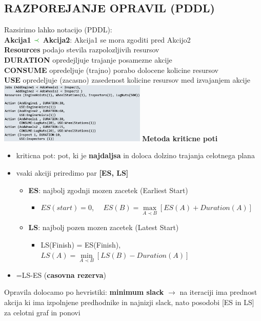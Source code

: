 \subsection{RAZPOREJANJE OPRAVIL (PDDL)}
Razsirimo lahko notacijo (PDDL):\\
\textbf{Akcija1 $\green{\prec}$ Akcija2}: Akcija1 se mora zgoditi pred Akcijo2\\
\textbf{Resources} podajo stevila razpolozljivih resursov\\
\textbf{DURATION} opredejljuje trajanje posamezne akcije\\
\textbf{CONSUME} opredeljuje (trajno) porabo dolocene kolicine resursov\\
\textbf{USE} opredeljuje (zacasno) zasedenost kolicine resursov med izvajanjem akcije\\
\includegraphics[width=7cm]{./images/pddl.png}
\textbf{Metoda kriticne poti}
\begin{itemize}[leftmargin=*,noitemsep,topsep=0pt]
    \item kriticna pot: pot, ki je \textbf{najdaljsa} in doloca dolzino trajanja celotnega plana
    \item vsaki akciji priredimo par \textbf{[ES, LS]}
    \begin{itemize}[leftmargin=*,noitemsep,topsep=0pt]
        \item \textbf{ES}: najbolj zgodnji mozen zacetek (Earliest Start)
        \begin{itemize}[leftmargin=*,noitemsep,topsep=0pt]
            \item $ES(start) = 0$, $\quad ES(B) = \max\limits_{A \prec B} \left[ ES(A) + Duration(A)\right]$
        \end{itemize}
        \item \textbf{LS}: najbolj pozen mozen zacetek (Latest Start)
        \begin{itemize}[leftmargin=*,noitemsep,topsep=0pt]
            \item LS(Finish) = ES(Finish), $LS(A) = \min\limits_{A\prec B}\left[ LS(B) - Duration(A)\right]$
        \end{itemize}
    \end{itemize}
    \item {}=LS-ES (\textbf{casovna rezerva})
\end{itemize}
Opravila dolocamo po hevristiki: \textbf{minimum slack} $\rightarrow$ na iteraciji ima prednost akcija 
ki ima izpolnjene predhodnike in najnizji slack, nato posodobi [ES in LS] za celotni graf in ponovi

